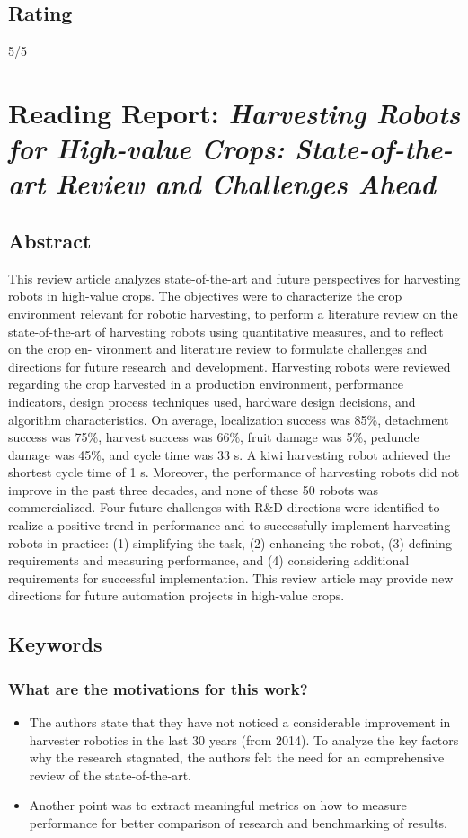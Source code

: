     \subsection*{Rating}
    5/5
    
    \newpage
    \section{Reading Report: \emph{Harvesting Robots for High-value Crops: State-of-the-art Review and Challenges Ahead}}
    \cite{Bac2014}
    
    \subsection*{Abstract}
    This review article analyzes state-of-the-art and future perspectives for harvesting robots in high-value crops.
    The objectives were to characterize the crop environment relevant for robotic harvesting, to perform a literature
    review on the state-of-the-art of harvesting robots using quantitative measures, and to reflect on the crop en-
    vironment and literature review to formulate challenges and directions for future research and development.
    Harvesting robots were reviewed regarding the crop harvested in a production environment, performance indicators, design process techniques used, hardware design decisions, and algorithm characteristics. On average,
    localization success was 85\%, detachment success was 75\%, harvest success was 66\%, fruit damage was 5\%,
    peduncle damage was 45\%, and cycle time was 33 s. A kiwi harvesting robot achieved the shortest cycle time
    of 1 s. Moreover, the performance of harvesting robots did not improve in the past three decades, and none
    of these 50 robots was commercialized. Four future challenges with R\&D directions were identified to realize
    a positive trend in performance and to successfully implement harvesting robots in practice: (1) simplifying
    the task, (2) enhancing the robot, (3) defining requirements and measuring performance, and (4) considering
    additional requirements for successful implementation. This review article may provide new directions for
    future automation projects in high-value crops.
    \subsection*{Keywords}
    
     
    \subsubsection*{What are the motivations for this work?}
    \begin{itemize}
        \item The authors state that they have not noticed a considerable improvement in harvester robotics in the last 30 years (from 2014). To analyze the key factors why the research stagnated, the authors felt the need for an comprehensive review of the state-of-the-art.
        \item Another point was to extract meaningful metrics on how to measure performance for better comparison of research and benchmarking of results.
    \end{itemize}
